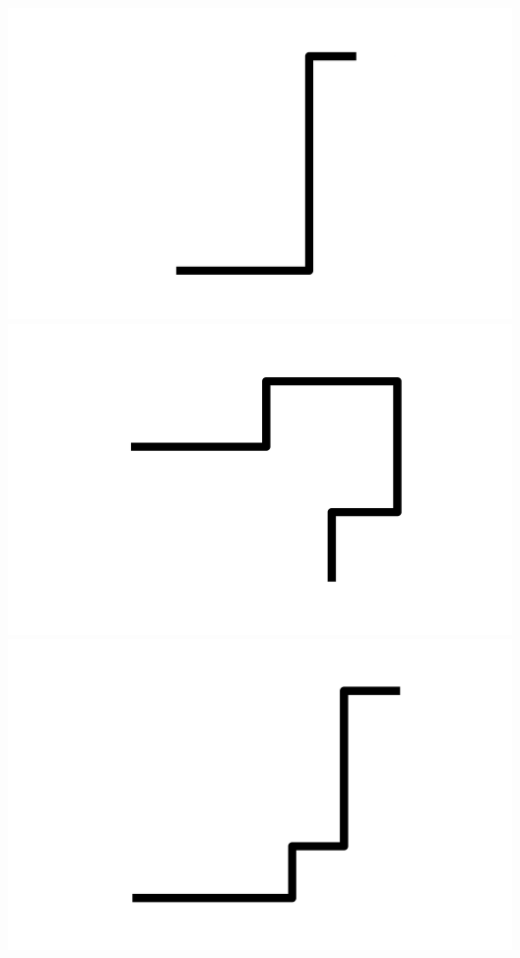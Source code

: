 \documentclass[]{report}
\begin{document}
\includegraphics[scale=.1]{pictures/21/state_cluster_shapes_151.pdf} 
\includegraphics[scale=.1]{pictures/21/state_cluster_shapes_152.pdf} 
\includegraphics[scale=.1]{pictures/21/state_cluster_shapes_153.pdf} 
\end{document}
